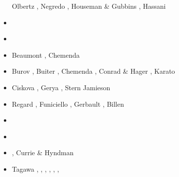 \begin{scriptsize}
\begin{itemize}
                            Olbertz \etal \cite{olwh97}, Negredo \etal \cite{nesg97}, 
                            Houseman \& Gubbins \cite{hogu97}, Hassani \etal \cite{hajc97}
\item[\nineteenninetyeight] \cite{itki98}\cite{buwg98}
                            \cite{brmy98}\cite{jabf98}
                            \cite{wabb98}
\item[\nineteenninetynine] \cite{hagu99}\cite{befo99}
                           \cite{bumo99}\cite{roda99}
                           \cite{elbp99}\cite{scmr99}
                           \cite{elbe99}\cite{beep99}
                           \cite{nesb99}
\item[\twothousand] \cite{tesc00}\cite{brky00}
                    Beaumont \etal \cite{bemh00}, Chemenda \etal \cite{chlb00}
\item[\twothousandone] Burov \etal \cite{bujl01}, Buiter \etal \cite{bugw01},
                       Chemenda \etal \cite{chys01}, Conrad \& Hager \cite{coha01}, 
                       Karato \etal \cite{kary01}
\item[\twothousandtwo] Ciskova \etal \cite{civv02},
                       Gerya \etal \cite{gesp02}, Stern \cite{ster02}
                       Jamieson \etal \cite{jabn02}
\item[\twothousandthree] Regard \etal \cite{refm03}, Funiciello \etal \cite{fumr03}, 
                         Gerbault \etal \cite{gehd03}, Billen \etal \cite{bigs03}
\item[\twothousandfour] \cite{toba04}\cite{bocj04}
                        \cite{bejn04}\cite{tobj04}
                        \cite{sche04}\cite{sche04b}
                        \cite{enwi04}\cite{geys04}
\item[\twothousandfive] \cite{jalo05}\cite{lahb05}
                        \cite{gowo05}\cite{enbs05}
                        \cite{artd05}\cite{gowo05}
                        \cite{mage05}\cite{stge05}
                        \cite{sche05}\cite{lahb05}
\item[\twothousandsix] \cite{degw06}\cite{rohu06}
                       \cite{masr06}\cite{gest06}
                       \cite{fump06}\cite{pibf06}
                       \cite{stfs06}\cite{libi06}
                       \cite{hapf06}\cite{sobk06}
                       \cite{syab06}, Currie \& Hyndman \cite{cuhy06}
\item[\twothousandseven] Tagawa \etal \cite{tank07}, \cite{artd07},
                         \cite{yaab07}, \cite{cubh07},
                         \cite{civv07}, \cite{masp07},

\end{itemize}
\end{scriptsize}
